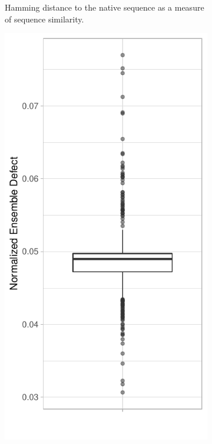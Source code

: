 \documentclass[../../master.tex]{subfiles}
\begin{document}
\begin{figure}[!ht]
\begin{subfigure}[t]{0.2\textwidth}
		\caption{Hamming distance to the native sequence as a measure of sequence similarity.
		}\label{fig:stats_proto:a}
	\end{subfigure}%
	\begin{subfigure}[t]{0.2\textwidth}
		\centering
		\includegraphics[width=\textwidth]{pic/results/designs/boxplots/proto-score-boxplot.pdf}

\end{subfigure}
\end{figure}
\end{document}
